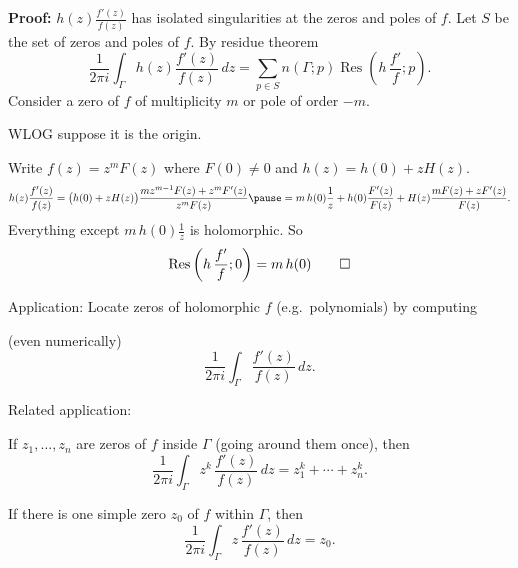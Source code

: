 \documentclass[10pt,aspectratio=169]{beamer}
\begin{document}
\begin{frame}
\textbf{Proof:}
$h(z) \frac{f'(z)}{f(z)}$ has isolated singularities
at the zeros and poles of $f$.
\pause
Let $S$ be the set of zeros and poles of $f$.
\pause
By residue theorem
\begin{equation*}
\frac{1}{2\pi i}
\int_\Gamma h(z) \frac{f'(z)}{f(z)} \, dz
=
\sum_{p \in S} n(\Gamma;p)\operatorname{Res}\left(h \, \frac{f'}{f};p\right) .
\end{equation*}
\pause
Consider a zero of $f$ of multiplicity $m$ or pole of
order $-m$.

WLOG suppose it is the origin.

\medskip
\pause

Write $f(z)  = z^m F(z)$ where $F(0) \not=0$
and $h(z) = h(0) + z H(z)$.
\pause
\[
h(z) \frac{f'(z)}{f(z)}
=
\bigl( h(0) + z H(z) \bigr)
\frac{m z^{m-1} F(z) + z^m F'(z)}{z^m F(z)}
\pause
=
m\, h(0) 
\frac{1}{z}
+
h(0) 
\frac{F'(z)}{F(z)}
+
H(z)
\frac{m F(z) + z F'(z)}{F(z)} .
\]
\pause
Everything except $m\, h(0) \frac{1}{z}$ is holomorphic.
So
\[
\operatorname{Res}\left(h \, \frac{f'}{f};0\right) = m\, h(0)
\qed
\]
\end{frame}

\begin{frame}
Application:
Locate zeros of holomorphic $f$ (e.g.\ polynomials) by computing

(even numerically)
\[
\frac{1}{2\pi i}
\int_\Gamma \frac{f'(z)}{f(z)} \, dz .
\]

\pause

Related application:

If $z_1,\ldots,z_n$ are zeros of $f$ inside $\Gamma$ (going around them once), then
\begin{equation*}
\frac{1}{2\pi i}
\int_\Gamma z^k \, \frac{f'(z)}{f(z)} \, dz
=
z_1^k + \cdots + z_n^k .
\end{equation*}

\pause

If there is one simple zero $z_0$ of
$f$ within $\Gamma$, then
\begin{equation*}
\frac{1}{2\pi i}
\int_\Gamma z \, \frac{f'(z)}{f(z)} \, dz
=
z_0 .
\end{equation*}

\end{frame}
\end{document}
